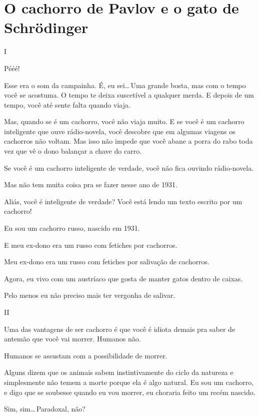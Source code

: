 \chapter{O cachorro de Pavlov e o gato de Schrödinger}

\begin{center}
{\Large I}
\end{center}

Pééé!

Esse era o som da campainha. É, eu sei\ldots\,Uma grande bosta, mas com o tempo você se acostuma. O tempo te deixa suscetível a qualquer merda. E depois de um tempo, você até sente falta quando viaja.

Mas, quando se é um cachorro, você não viaja muito. E se você é um cachorro inteligente que ouve rádio-novela, você descobre que em algumas viagens os cachorros não voltam. Mas isso não impede que você abane a porra do rabo toda vez que vê o dono balançar a chave do carro.

Se você é um cachorro inteligente de verdade, você não fica ouvindo rádio-novela.

Mas não tem muita coisa pra se fazer nesse ano de 1931.

Aliás, você é inteligente de verdade? Você está lendo um texto escrito por um cachorro!

Eu sou um cachorro russo, nascido em 1931.

E meu ex-dono era um russo com fetiches por cachorros.

Meu ex-dono era um russo com fetiches por salivação de cachorros.

Agora, eu vivo com um austríaco que gosta de manter gatos dentro de caixas.

Pelo menos eu não preciso mais ter vergonha de salivar.

\begin{center}
{\Large II}
\end{center}

Uma das vantagens de ser cachorro é que você é idiota demais pra saber de antemão que você vai morrer. Humanos não.

Humanos se assustam com a possibilidade de morrer.

Alguns dizem que os animais sabem instintivamente do ciclo da natureza e simplesmente não temem a morte porque ela é algo natural. Eu sou um cachorro, e digo que se soubesse quando eu vou morrer, eu choraria feito um recém nascido.

Sim, sim\ldots\,Paradoxal, não?


